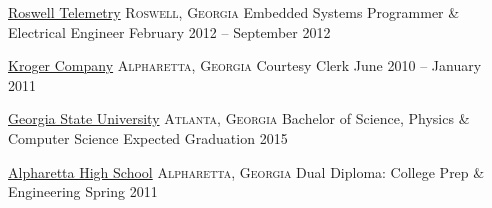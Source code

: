 \documentclass[10pt,a4paper]{article}
\begin{document}
\headedsection
  {\href{http://www.roswelltelemetry.com}{Roswell Telemetry}}
  {\textsc{Roswell, Georgia}} {%
  \headedsubsection
    {Embedded Systems Programmer \& Electrical Engineer}
    {February 2012 -- September 2012}
    {}
}

\headedsection
  {\href{https://www.kroger.com/}{Kroger Company}}
  {\textsc{Alpharetta, Georgia}} {%
  \headedsubsection
    {Courtesy Clerk}
    {June 2010 -- January 2011}
    {}
}


\spacedhrule{0.2em}{-0.4em}


\headedsection
  {\href{http://www.gsu.edu}{Georgia State University}}
  {\textsc{Atlanta, Georgia}} {%
  \headedsubsection
    {Bachelor of Science, Physics \& Computer Science}
    {Expected Graduation 2015}
    {}
}

\headedsection
  {\href{http://school.fultonschools.org/hs/alpharetta/pages/default.aspx}{Alpharetta High School}}
  {\textsc{Alpharetta, Georgia}} {%
  \headedsubsection
    {Dual Diploma: College Prep \& Engineering}
    {Spring 2011} {}
}

\spacedhrule{0.5em}{-0.4em}

\end{document}
